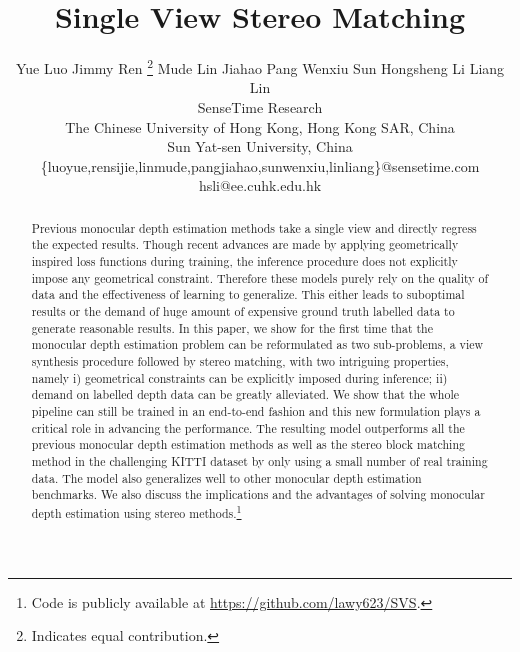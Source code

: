 \documentclass[10pt,twocolumn,letterpaper]{article}
\begin{document}
\title{Single View Stereo Matching}


\author{
Yue Luo  \hspace{0.03in} Jimmy Ren \thanks{Indicates equal contribution.} \hspace{0.03in} Mude Lin \hspace{0.03in} Jiahao Pang \hspace{0.03in} Wenxiu Sun \hspace{0.03in} Hongsheng Li \hspace{0.03in} Liang Lin\\
SenseTime Research\\
The Chinese University of Hong Kong, Hong Kong SAR, China\\
Sun Yat-sen University, China\\
\{luoyue,rensijie,linmude,pangjiahao,sunwenxiu,linliang\}@sensetime.com\\
hsli@ee.cuhk.edu.hk\\
}



\maketitle
\thispagestyle{empty}

  
\begin{abstract}
   Previous monocular depth estimation methods take a single view and directly regress the expected results. Though recent advances are made by applying geometrically inspired loss functions during training, the inference procedure does not explicitly impose any geometrical constraint. Therefore these models purely rely on the quality of data and the effectiveness of learning to generalize. This either leads to suboptimal results or the demand of huge amount of expensive ground truth labelled data to generate reasonable results. In this paper, we show for the first time that the monocular depth estimation problem can be reformulated as two sub-problems, a view synthesis procedure followed by stereo matching, with two intriguing properties, namely i) geometrical constraints can be explicitly imposed during inference; ii) demand on labelled depth data can be greatly alleviated. We show that the whole pipeline can still be trained in an end-to-end fashion and this new formulation plays a critical role in advancing the performance. The resulting model outperforms all the previous monocular depth estimation methods as well as the stereo block matching method in the challenging KITTI dataset by only using a small number of real training data. The model also generalizes well to other monocular depth estimation benchmarks. We also discuss the implications and the advantages of solving monocular depth estimation using stereo methods.\footnote{Code is publicly available at \url{https://github.com/lawy623/SVS}.}
\end{abstract}
\end{document}
